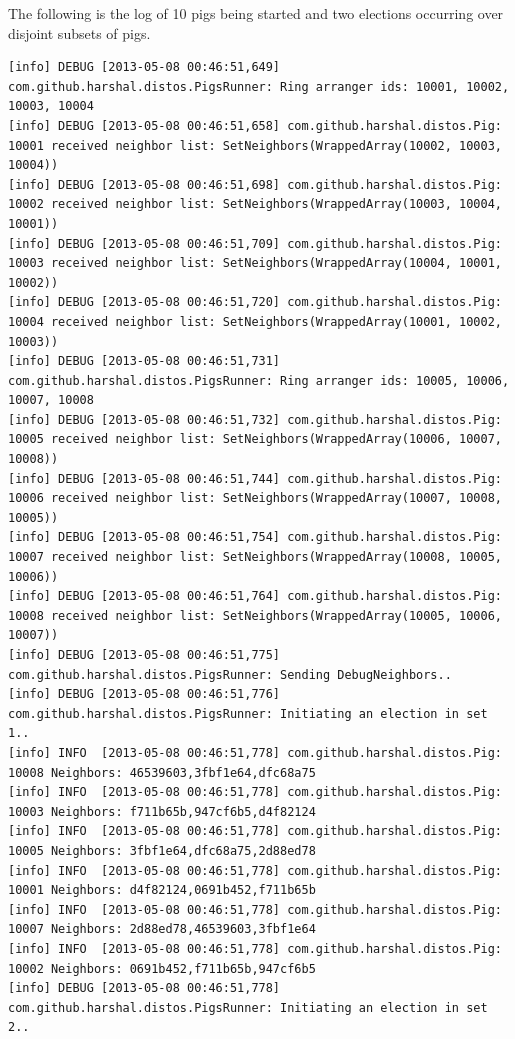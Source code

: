 \documentclass[]{article}
\begin{document}
The following is the log of 10 pigs being started and two elections occurring over disjoint subsets of pigs.
\tiny\begin{verbatim}
[info] DEBUG [2013-05-08 00:46:51,649] com.github.harshal.distos.PigsRunner: Ring arranger ids: 10001, 10002, 10003, 10004
[info] DEBUG [2013-05-08 00:46:51,658] com.github.harshal.distos.Pig: 10001 received neighbor list: SetNeighbors(WrappedArray(10002, 10003, 10004))
[info] DEBUG [2013-05-08 00:46:51,698] com.github.harshal.distos.Pig: 10002 received neighbor list: SetNeighbors(WrappedArray(10003, 10004, 10001))
[info] DEBUG [2013-05-08 00:46:51,709] com.github.harshal.distos.Pig: 10003 received neighbor list: SetNeighbors(WrappedArray(10004, 10001, 10002))
[info] DEBUG [2013-05-08 00:46:51,720] com.github.harshal.distos.Pig: 10004 received neighbor list: SetNeighbors(WrappedArray(10001, 10002, 10003))
[info] DEBUG [2013-05-08 00:46:51,731] com.github.harshal.distos.PigsRunner: Ring arranger ids: 10005, 10006, 10007, 10008
[info] DEBUG [2013-05-08 00:46:51,732] com.github.harshal.distos.Pig: 10005 received neighbor list: SetNeighbors(WrappedArray(10006, 10007, 10008))
[info] DEBUG [2013-05-08 00:46:51,744] com.github.harshal.distos.Pig: 10006 received neighbor list: SetNeighbors(WrappedArray(10007, 10008, 10005))
[info] DEBUG [2013-05-08 00:46:51,754] com.github.harshal.distos.Pig: 10007 received neighbor list: SetNeighbors(WrappedArray(10008, 10005, 10006))
[info] DEBUG [2013-05-08 00:46:51,764] com.github.harshal.distos.Pig: 10008 received neighbor list: SetNeighbors(WrappedArray(10005, 10006, 10007))
[info] DEBUG [2013-05-08 00:46:51,775] com.github.harshal.distos.PigsRunner: Sending DebugNeighbors..
[info] DEBUG [2013-05-08 00:46:51,776] com.github.harshal.distos.PigsRunner: Initiating an election in set 1..
[info] INFO  [2013-05-08 00:46:51,778] com.github.harshal.distos.Pig: 10008 Neighbors: 46539603,3fbf1e64,dfc68a75
[info] INFO  [2013-05-08 00:46:51,778] com.github.harshal.distos.Pig: 10003 Neighbors: f711b65b,947cf6b5,d4f82124
[info] INFO  [2013-05-08 00:46:51,778] com.github.harshal.distos.Pig: 10005 Neighbors: 3fbf1e64,dfc68a75,2d88ed78
[info] INFO  [2013-05-08 00:46:51,778] com.github.harshal.distos.Pig: 10001 Neighbors: d4f82124,0691b452,f711b65b
[info] INFO  [2013-05-08 00:46:51,778] com.github.harshal.distos.Pig: 10007 Neighbors: 2d88ed78,46539603,3fbf1e64
[info] INFO  [2013-05-08 00:46:51,778] com.github.harshal.distos.Pig: 10002 Neighbors: 0691b452,f711b65b,947cf6b5
[info] DEBUG [2013-05-08 00:46:51,778] com.github.harshal.distos.PigsRunner: Initiating an election in set 2..

\end{verbatim}
\end{document}
